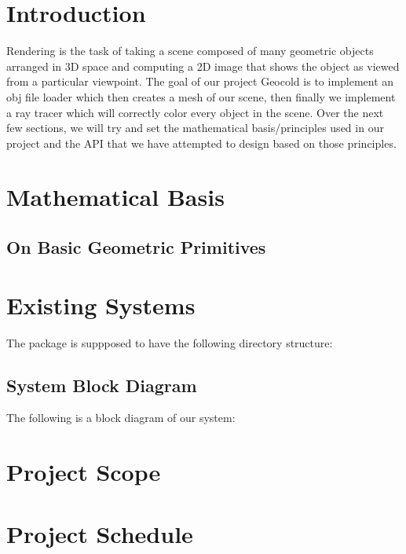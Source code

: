\documentclass[12pt]{article}
\newcommand\PROJECTNAME{Geocold}
\begin{document}
\section{Introduction}
Rendering is the task of taking a scene composed of many geometric 
objects arranged in 3D space and computing a 2D image that shows the object 
as viewed from a particular viewpoint. The goal of our project \PROJECTNAME 
is to implement an obj file loader which then creates a mesh of our scene,
then finally we implement a ray tracer which will correctly color every
object in the scene. Over the next few sections, we will try and set the mathematical 
basis/principles used in our project and the API that we have attempted to design based on those 
principles.

\section{Mathematical Basis}





\subsection{On Basic Geometric Primitives}

\section{Existing Systems}


\newpage
The package is suppposed to have the following directory structure:
\\


\subsection{System Block Diagram}
The following is a block diagram of our system:

\newpage

\section{Project Scope}


\section{Project Schedule}


\newpage
\printbibliography
\end{document}
